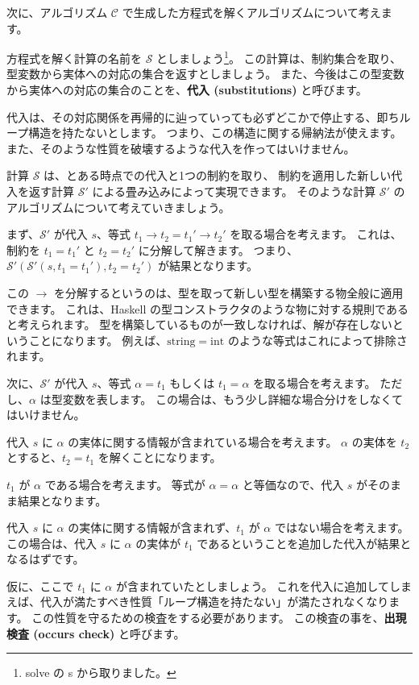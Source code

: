 次に、アルゴリズム $\mathcal C$ で生成した方程式を解くアルゴリズムについて考えます。

方程式を解く計算の名前を $\mathcal S$ としましょう\footnote{solve の s から取りました。}。
この計算は、制約集合を取り、型変数から実体への対応の集合を返すとしましょう。
また、今後はこの型変数から実体への対応の集合のことを、\textbf{代入 (substitutions)} と呼びます。

代入は、その対応関係を再帰的に辿っていっても必ずどこかで停止する、即ちループ構造を持たないとします。
つまり、この構造に関する帰納法が使えます。
また、そのような性質を破壊するような代入を作ってはいけません。

計算 $\mathcal S$ は、とある時点での代入と1つの制約を取り、
制約を適用した新しい代入を返す計算 $\mathcal{S'}$ による畳み込みによって実現できます。
そのような計算 $\mathcal{S'}$ のアルゴリズムについて考えていきましょう。

まず、$\mathcal{S'}$ が代入 $s$、等式 $t_1 \to t_2 = t_1' \to t_2'$ を取る場合を考えます。
これは、制約を $t_1 = t_1'$ と $t_2 = t_2'$ に分解して解きます。
つまり、$\mathcal{S'}(\mathcal{S'}(s, t_1 = t_1'), t_2 = t_2')$ が結果となります。

この $\to$ を分解するというのは、型を取って新しい型を構築する物全般に適用できます。
これは、Haskell の型コンストラクタのような物に対する規則であると考えられます。
型を構築しているものが一致しなければ、解が存在しないということになります。
例えば、$\mathrm{string} = \mathrm{int}$ のような等式はこれによって排除されます。

次に、$\mathcal{S'}$ が代入 $s$、等式 $\alpha = t_1$ もしくは $t_1 = \alpha$ を取る場合を考えます。
ただし、$\alpha$ は型変数を表します。
この場合は、もう少し詳細な場合分けをしなくてはいけません。

代入 $s$ に $\alpha$ の実体に関する情報が含まれている場合を考えます。
$\alpha$ の実体を $t_2$ とすると、$t_2 = t_1$ を解くことになります。

$t_1$ が $\alpha$ である場合を考えます。
等式が $\alpha = \alpha$ と等価なので、代入 $s$ がそのまま結果となります。

代入 $s$ に $\alpha$ の実体に関する情報が含まれず、$t_1$ が $\alpha$ ではない場合を考えます。
この場合は、代入 $s$ に $\alpha$ の実体が $t_1$ であるということを追加した代入が結果となるはずです。

仮に、ここで $t_1$ に $\alpha$ が含まれていたとしましょう。
これを代入に追加してしまえば、代入が満たすべき性質「ループ構造を持たない」が満たされなくなります。
この性質を守るための検査をする必要があります。
この検査の事を、\textbf{出現検査 (occurs check)} と呼びます。

